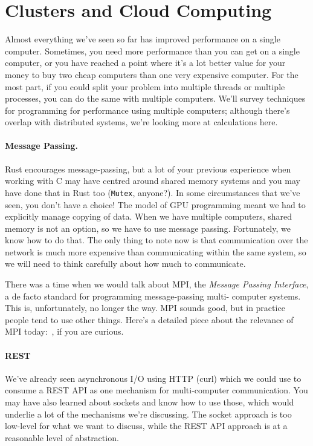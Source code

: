\documentclass[a4paper]{report}
\begin{document}

\section*{Clusters and Cloud Computing}
Almost everything we've seen so far has improved performance on a single
computer. Sometimes, you need more performance than you can get on a
single computer, or you have reached a point where it's a lot better value for
your money to buy two cheap computers than one very expensive computer.
For the most part, if you could split your problem into
multiple threads or multiple processes, you can do the same with multiple
computers. We'll survey techniques for programming for
performance using multiple computers; although there's overlap with
distributed systems, we're looking more at calculations here.

\paragraph*{Message Passing.} Rust encourages message-passing, but
a lot of your previous experience when working with C may have centred around
shared memory systems and you may have done that in Rust too (\texttt{Mutex}, 
anyone?). In some circumstances that we've seen, you don't have a choice!
The model of GPU programming meant we had to explicitly
manage copying of data. When we have multiple computers, shared memory is not
an option, so we have to use message passing. Fortunately, we know how to do
that. The only thing to note now is that communication over the network is
much more expensive than communicating within the same system, so we will
need to think carefully about how much to communicate.

There was a time when we would talk about MPI, the \emph{Message Passing 
Interface}, a de facto standard for programming message-passing multi-
computer systems. This is, unfortunately, no longer the way. 
MPI sounds good, but in practice people tend to use other things. 
Here's a detailed piece about the relevance of MPI today:~\cite{hpcmpi}, if 
you are curious. 

\paragraph{REST}
We've already seen asynchronous I/O using HTTP (curl) which we could use to
consume a REST API as one mechanism for multi-computer communication. You
may have also learned about sockets and know how to use those, which would
underlie a lot of the mechanisms we're discussing. The socket approach is too
low-level for what we want to discuss, while the REST API approach is at a
reasonable level of abstraction. 
\end{document}
